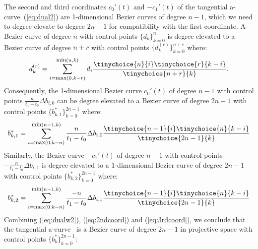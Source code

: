 \documentclass[12pt]{article}
\newcommand{\atang}{tangential a-curve\ }
\begin{document}
The second and third coordinates $c_0'(t)$ and $-c_1'(t)$
of the \atang (\ref{eq:dual2}) are 1-dimensional Bezier curves of degree $n-1$,
which we need to degree-elevate to degree $2n-1$
for compatibility with the first coordinate.
A Bezier curve of degree $n$ with control points $\{ d_k \}_{k=0}^n$ 
is degree elevated \cite{farin97} to a Bezier curve of degree $n+r$ with control points
$\{ d_k^{(r)} \}_{k=0}^{n+r}$ where:
\[
d_k^{(r)} = \sum_{i=\mbox{\footnotesize{max}}(0,k-r)}^{\mbox{\footnotesize{min}}(n,k)} 
		d_i \frac{\tinychoice{n}{i} \tinychoice{r}{k-i} }{ \tinychoice{n+r}{k} }.
\]
%
Consequently, the 1-dimensional Bezier curve $c_0'(t)$ 
of degree $n-1$ with control points $\frac{n}{t_1-t_0} \Delta b_{i,0}$ 
can be degree elevated to a Bezier curve of degree $2n-1$ with control points 
$\{b^*_{k,1} \}_{k=0}^{2n-1}$ where:
\begin{equation}
\label{eq:2ndcoord}
b^*_{k,1} = 
\sum_{i=\mbox{\footnotesize{max}}(0,k-n)}^{\mbox{\footnotesize{min}}(n-1,k)} 
	\frac{n}{t_1-t_0} \Delta b_{i,0}
	\frac{ \tinychoice{n-1}{i} \tinychoice{n}{k-i} }{ \tinychoice{2n-1}{k} }
\end{equation}
%
Similarly, the Bezier curve $-c_1'(t)$
of degree $n-1$ with control points $-\frac{n}{t_1-t_0} \Delta b_{i,1}$
is degree elevated to a 1-dimensional Bezier curve of degree $2n-1$
with control points $\{b^*_{k,2} \}_{k=0}^{2n-1}$ where:
\begin{equation}
\label{eq:3rdcoord}
b^*_{k,2} = 
\sum_{i=\mbox{\footnotesize{max}}(0,k-n)}^{\mbox{\footnotesize{min}}(n-1,k)} 
	\frac{-n}{t_1-t_0} \Delta b_{i,1}
	\frac{ \tinychoice{n-1}{i} \tinychoice{n}{k-i} }{ \tinychoice{2n-1}{k} }
\end{equation}
%
Combining (\ref{eq:dualw2}), (\ref{eq:2ndcoord}) and (\ref{eq:3rdcoord}),
we conclude that the \atang
is a Bezier curve of degree $2n-1$ in projective space with control points 
$\{b^*_k\}_{k=0}^{2n-1}$:
\end{document}
